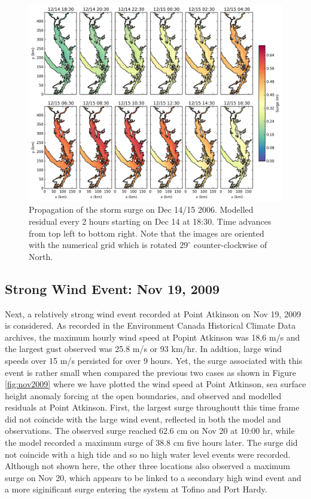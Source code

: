 \documentclass[pdftex,10pt]{article}
\begin{document}
\begin{figure}
\centering
\includegraphics[scale=0.6]{Figures/dec2006_spatial.pdf}
\caption{Propagation of the storm surge on Dec 14/15 2006. Modelled residual every 2 hours starting on Dec 14 at 18:30. Time advances from top left to bottom right. Note that the images are oriented with the numerical grid which is rotated $29^{\circ}$ counter-clockwise of North. }
\label{fig:spatial}
\end{figure}

\subsection{Strong Wind Event: Nov 19, 2009}
Next, a relatively strong wind event recorded at Point Atkinson on Nov 19, 2009 is considered. As recorded in the Environment Canada Historical Climate Data archives, the maximum hourly wind speed at Popint Atkinson was 18.6 m/s and the largest gust observed was 25.8 m/s or 93 km/hr. In addtion, large wind speeds over 15 m/s persisted for over 9 hours. Yet, the surge associated with this event is rather small when compared the previous two cases as shown in Figure \ref{fig:nov2009} where we have plotted the wind speed at Point Atkinson, sea surface height anomaly forcing at the open boundaries, and observed and modelled residuals at Point Atkinson. First, the largest surge throughoutt this time frame did not coincide with the large wind event, reflected in both the model and observations. The observed surge reached 62.6 cm on Nov 20 at 10:00 hr, while the model recorded a maximum surge of 38.8 cm five hours later. The surge did not coincide with a high tide and so no high water level events were recorded. Although not shown here, the other three locations also observed a maximum surge on Nov 20, which appears to be linked to a secondary high wind event and a more siginificant surge entering the system at Tofino and Port Hardy. 
\end{document}
